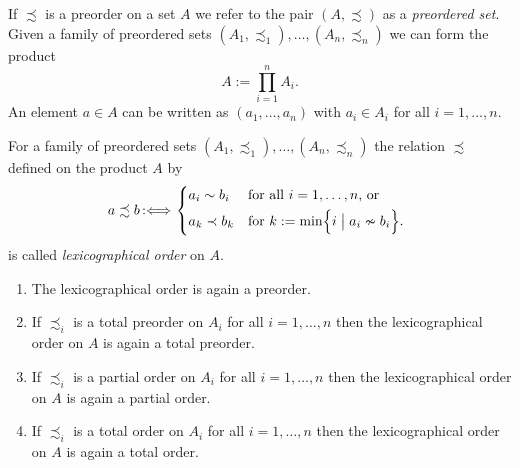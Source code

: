 ﻿\documentclass[a4paper,11pt,twoside,final]{article}
\newcommand{\defby}{\mbox{\ensuremath{\,:\Longleftrightarrow\,}}\xspace}
\numberwithin{equation}{subsection}
\begin{document}
If $\precsim$ is a preorder on a set $A$ we refer to the pair $(A,\precsim)$ as a \emph{preordered set}. Given a family of preordered sets $(A_1,\precsim_1),\dotsc,(A_n,\precsim_n)$ we can form the product
\begin{equation*}
A:=\prod_{i=1}^n A_i.
\end{equation*}
An element $a\in A$ can be written as $(a_1,\dotsc,a_n)$ with $a_i\in A_i$ for all $i=1,\dotsc,n$.

\begin{defi}\label{lexorder}
For a family of preordered sets $(A_1,\precsim_1),\dotsc,(A_n,\precsim_n)$ the relation $\precsim$ defined on the product $A$ by
\begin{equation*}
a \precsim b\defby \begin{dcases*}
a_i \sim b_i & for all $i=1,\dotsc,n$, or\\
a_k \prec b_k & for $k:=\min\Bigl\{i\bigm| a_i\nsim b_i\Bigr\}$.
\end{dcases*}
\end{equation*}
is called \emph{lexicographical order} on $A$.
\end{defi}

\begin{prop}
\begin{enumerate}
\item The lexicographical order is again a preorder.
\item If $\precsim_i$ is a total preorder on $A_i$ for all $i=1,\dotsc,n$ then the lexicographical order on $A$ is again a total preorder.
\item If $\precsim_i$ is a partial order on $A_i$ for all $i=1,\dotsc,n$ then the lexicographical order on $A$ is again a partial order.
\item If $\precsim_i$ is a total order on $A_i$ for all $i=1,\dotsc,n$ then the lexicographical order on $A$ is again a total order.
\end{enumerate}
\end{prop}
\end{document}
